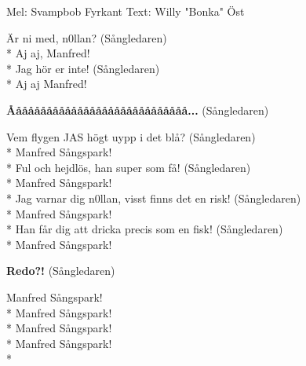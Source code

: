 \begin{SongText}
    \begin{SongInfo}
        Mel: Svampbob Fyrkant
        Text: Willy "Bonka" Öst
    \end{SongInfo}
    \begin{SongVerse}
        Är ni med, n0llan? (Sångledaren)\\*%
        Aj aj, Manfred!\\*%
        Jag hör er inte! (Sångledaren)\\*%
        Aj aj Manfred!
    \end{SongVerse}
    \begin{SongVerse}
        \textbf{Ååååååååååååååååååååååååååååå...} (Sångledaren)
    \end{SongVerse}
    \begin{SongVerse}
        Vem flygen JAS högt uypp i det blå? (Sångledaren)\\*%
        Manfred Sångspark!\\*%
        Ful och hejdlös, han super som få! (Sångledaren)\\*%
        Manfred Sångspark!\\*%
        Jag varnar dig n0llan, visst finns det en risk! (Sångledaren)\\*%
        Manfred Sångspark!\\*%
        Han får dig att dricka precis som en fisk! (Sångledaren)\\*%
        Manfred Sångspark!
    \end{SongVerse}
    \begin{SongVerse}
        \textbf{Redo?!} (Sångledaren)
    \end{SongVerse}
    \begin{SongVerse}
        Manfred Sångspark!\\*%
        Manfred Sångspark!\\*%
        Manfred Sångspark!\\*%
        Manfred Sångspark!\\*%
    \end{SongVerse}
\end{SongText}
